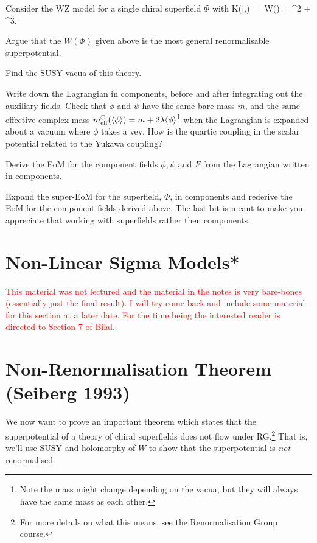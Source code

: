 \bbox 
    Consider the WZ model for a single chiral superfield $\Phi$ with 
    \bse 
        K(\bar{\Phi},\Phi) = \bar{\Phi}\Phi \qand W(\Phi) = \Phi^2 + \Phi^3.
    \ese 
    \ben 
        \item Argue that the $W(\Phi)$ given above is the most general renormalisable superpotential.
        \item Find the SUSY vacua of this theory.
        \item Write down the Lagrangian in components, before and after integrating out the auxiliary fields. Check that $\phi$ and $\psi$ have the same bare mass $m$, and the same effective complex mass $m^{\mathbb{C}}_{\text{eff}}(\langle\phi\rangle) = m + 2\lambda\langle\phi\rangle$\footnote{Note the mass might change depending on the vacua, but they will always have the same mass as each other.} when the Lagrangian is expanded about a vacuum where $\phi$ takes a vev. How is the quartic coupling in the scalar potential related to the Yukawa coupling?
        \item Derive the EoM for the component fields $\phi,\psi$ and $F$ from the Lagrangian written in components.
        \item Expand the super-EoM for the superfield, $\Phi$, in components and rederive the EoM for the component fields derived above.
    \een 
    The last bit is meant to make you appreciate that working with superfields rather then components. 
\ebox  

\section{Non-Linear Sigma Models*}

\textcolor{red}{This material was not lectured and the material in the notes is very bare-bones (essentially just the final result). I will try come back and include some material for this section at a later date. For the time being the interested reader is directed to Section 7 of Bilal. }

\section{Non-Renormalisation Theorem (Seiberg 1993)}

We now want to prove an important theorem which states that the superpotential of a theory of chiral superfields does not flow under RG.\footnote{For more details on what this means, see the Renormalisation Group course.} That is, we'll use SUSY and holomorphy of $W$ to show that the superpotential is \textit{not} renormalised.

